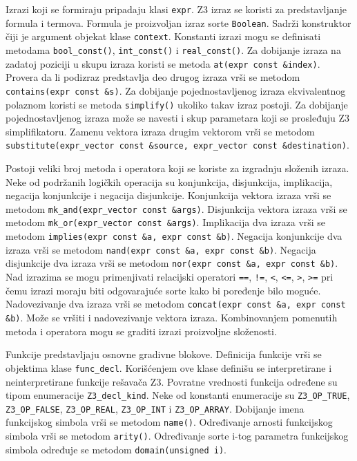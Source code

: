 \documentclass[12pt,oneside]{memoir}
\begin{document}
Izrazi koji se formiraju pripadaju klasi \texttt{expr}. Z3 izraz se koristi za predstavljanje formula i termova. Formula je proizvoljan izraz sorte \texttt{Boolean}. Sadrži konstruktor čiji je argument objekat klase \texttt{context}. Konstanti izrazi mogu se definisati metodama \texttt{bool\_const()}, \texttt{int\_const()} i \texttt{real\_const()}. Za dobijanje izraza na zadatoj poziciji u skupu izraza koristi se metoda \texttt{at(expr const \&index)}.  Provera da li podizraz predstavlja deo drugog izraza vrši se metodom  \texttt{contains(expr const \&s)}. Za dobijanje pojednostavljenog izraza ekvivalentnog polaznom koristi se metoda \texttt{simplify()} ukoliko takav izraz postoji. Za dobijanje pojednostavljenog izraza može se navesti i skup parametara koji se prosleđuju Z3 simplifikatoru. Zamenu vektora izraza drugim vektorom vrši se metodom \texttt{substitute(expr\_vector const \&source, expr\_vector const \&destination)}. 
\par
Postoji veliki broj metoda i operatora koji se koriste za izgradnju složenih izraza. Neke od podržanih logičkih operacija su konjunkcija, disjunkcija, implikacija, negacija konjunkcije i negacija disjunkcije. Konjunkcija vektora izraza vrši se metodom \texttt{mk\_and(expr\_vector const \&args)}. Disjunkcija vektora izraza vrši se metodom \texttt{mk\_or(expr\_vector const \&args)}. Implikacija dva izraza vrši se metodom \texttt{implies(expr const \&a, expr const \&b)}. Negacija konjunkcije dva izraza vrši se metodom \texttt{nand(expr const  \&a, expr const \&b)}. Negacija disjunkcije dva izraza vrši se metodom \texttt{nor(expr const \&a, expr const \&b)}. Nad izrazima se mogu primenjivati relacijski operatori \texttt{==}, \texttt{!=}, \texttt{<}, \texttt{<=}, \texttt{>}, \texttt{>=} pri čemu izrazi moraju biti odgovarajuće sorte kako bi poređenje bilo moguće. Nadovezivanje dva izraza vrši se metodom \texttt{concat(expr const \&a, expr const \&b)}. Može se vršiti i nadovezivanje vektora izraza. Kombinovanjem pomenutih metoda i operatora mogu se graditi izrazi proizvoljne složenosti. 	
\par
Funkcije predstavljaju osnovne gradivne blokove. Definicija funkcije vrši se objektima klase \texttt{func\_decl}. Korišćenjem ove klase definišu se interpretirane i neinterpretirane funkcije rešavača Z3. 
Povratne vrednosti funkcija određene su tipom enumeracije \texttt{Z3\_decl\_kind}. Neke od konstanti enumeracije su \texttt{Z3\_OP\_TRUE}, \texttt{Z3\_OP\_FALSE}, \texttt{Z3\_OP\_REAL}, \texttt{Z3\_OP\_INT} i \texttt{Z3\_OP\_ARRAY}. Dobijanje imena funkcijskog simbola vrši se metodom \texttt{name()}. Određivanje arnosti funkcijskog simbola vrši se metodom \texttt{arity()}. Određivanje sorte i-tog parametra funkcijskog simbola određuje se metodom \texttt{domain(unsigned i)}. 
\par
\end{document}
